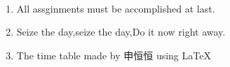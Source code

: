 \documentclass[landscape,a4paper]{article}
\begin{document}
\begin{CJK}{UTF8}{gbsn}
\begin{calendar}{\hsize}
 
\finishCalendar
\end{calendar}
\\

\begin{enumerate}

\item All assginments must be accomplished at last.
\item Seize the day,seize the day,Do it now right away.
\item The time table made by 申恒恒 using \LaTeX{}

\end{enumerate}
\end{CJK}
\end{document}
